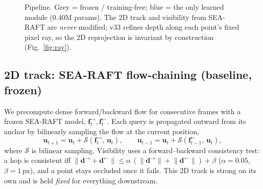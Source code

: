 \documentclass[11pt,a4paper]{article}
\begin{document}
\begin{figure}[h]
\centering
{}
\caption{Pipeline. Grey = frozen / training-free; blue = the only learned module ($0.40$M params).
The 2D track and visibility from SEA-RAFT are \emph{never} modified; v33 refines depth along each
point's fixed pixel ray, so the 2D reprojection is invariant by construction (Fig.~\ref{fig:ray}).}
\label{fig:pipeline}
\end{figure}

\subsection{2D track: SEA-RAFT flow-chaining (baseline, frozen)}
We precompute dense forward/backward flow for consecutive frames with a frozen SEA-RAFT model,
$\mathbf{f}^{\rightarrow}_t,\mathbf{f}^{\leftarrow}_t$. Each query is propagated outward from its
anchor by bilinearly sampling the flow at the current position,
\begin{equation}
\mathbf{u}_{t+1} = \mathbf{u}_t + \mathcal{S}\!\left(\mathbf{f}^{\rightarrow}_t,\,\mathbf{u}_t\right),
\qquad
\mathbf{u}_{t-1} = \mathbf{u}_t + \mathcal{S}\!\left(\mathbf{f}^{\leftarrow}_{t-1},\,\mathbf{u}_t\right),
\end{equation}
where $\mathcal{S}$ is bilinear sampling. Visibility uses a forward--backward consistency test:
a hop is consistent iff $\lVert \mathbf{d}^{\rightarrow}+\mathbf{d}^{\leftarrow}\rVert \le
\alpha\,(\lVert\mathbf{d}^{\rightarrow}\rVert+\lVert\mathbf{d}^{\leftarrow}\rVert)+\beta$
($\alpha{=}0.05$, $\beta{=}1$\,px), and a point stays occluded once it fails. This 2D track is
strong on its own and is held \emph{fixed} for everything downstream.
\end{document}
